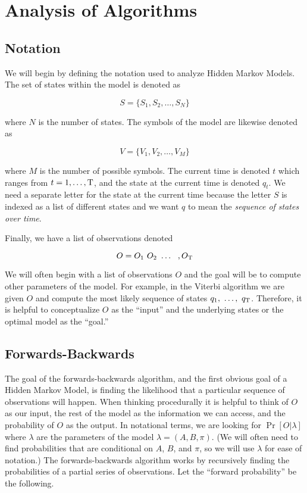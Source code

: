 
\section{Analysis of Algorithms}
\subsection{Notation}

We will begin by defining the notation used to analyze Hidden Markov
Models. The set of states within the model is denoted as

\begin{equation}
  S = \{S_1, S_2, \ldots, S_N \}
\end{equation}

where $N$ is the number of states. The symbols of the model are likewise
denoted as

\begin{equation}
  V = \{V_1, V_2, \ldots, V_M \}
\end{equation}

where $M$ is the number of possible symbols. The current time is denoted $t$
which ranges from $t=1, \ldots, \mathrm{T}$, and the state at the current
time is denoted $q_t$. We need a separate letter for the state at the
current time because the letter $S$ is indexed as a list of different
states and we want $q$ to mean the \emph{sequence of states over time}.

Finally, we have a list of observations denoted

\begin{equation}
  O = O_1\ O_2\ \ldots\ \ ,O_\Tau
\end{equation}

We will often begin with a list of observations $O$ and the goal will be
to compute other parameters of the model. For example, in the Viterbi
algorithm we are given $O$ and compute the most likely sequence of
states $q_1,\ \ldots,\ q_{\mathrm{T}}$. Therefore, it is helpful to
conceptualize $O$ as the ``input'' and the underlying states or the
optimal model as the ``goal.''

\subsection{Forwards-Backwards}

The goal of the forwards-backwards algorithm, and the first obvious goal
of a Hidden Markov Model, is finding the likelihood that a particular sequence of
observations will happen. When thinking procedurally it is helpful to think of $O$ as our input,
the rest of the model as the information we can access, and the
probability of $O$ as the output. In notational terms, we are looking for $\Pr[O
\vert \lambda]$ where $\lambda$ are the parameters of the model $\lambda
= (A, B, \pi)$. (We will often need to find probabilities that are
conditional on $A$, $B$, and $\pi$, so we will use $\lambda$ for ease of
notation.) The forwards-backwards algorithm works by recursively finding
the probabilities of a partial series of observations. Let the ``forward
probability'' be the following.

